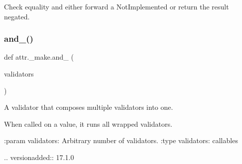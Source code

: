 \begin{DoxyVerb}Check equality and either forward a NotImplemented or return the result
negated.
\end{DoxyVerb}
 \mbox{\label{namespaceattr_1_1__make_a2d73711c774cd3afcd815955c895c654}} 
\subsubsection{\texorpdfstring{and\+\_\+()}{and\_()}}
{\footnotesize\ttfamily def attr.\+\_\+make.\+and\+\_\+ (\begin{DoxyParamCaption}\item[{}]{validators }\end{DoxyParamCaption})}

\begin{DoxyVerb}A validator that composes multiple validators into one.

When called on a value, it runs all wrapped validators.

:param validators: Arbitrary number of validators.
:type validators: callables

.. versionadded:: 17.1.0
\end{DoxyVerb}
 \mbox{\label{namespaceattr_1_1__make_aea3159bafb6597ea00ed372a8e07b769}} 
